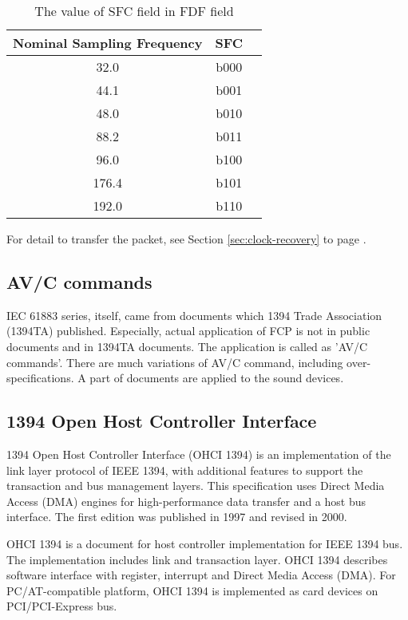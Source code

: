 \documentclass[onecolumn]{article}
\begin{document}
\begin{table}[H]
	\centering
	\caption{{The value of SFC field in FDF field}}
	\label{tbl:sfc-fdf}
	\begin{tabular}{ccc} \toprule
		Nominal Sampling Frequency & SFC \\ \midrule
		32.0	& b000 \\
		44.1	& b001 \\
		48.0	& b010 \\
		88.2	& b011 \\
		96.0	& b100 \\
		176.4	& b101 \\
		192.0	& b110 \\ \bottomrule
	\end{tabular}
\end{table}

For detail to transfer the packet, see Section \ref{sec:clock-recovery} to page \pageref{sec:clock-recovery}.

\subsection{AV/C commands}

IEC 61883 series, itself, came from documents which 1394 Trade Association (1394TA) published. Especially, actual application of FCP is not in public documents and in 1394TA documents. The application is called as 'AV/C commands'. There are much variations of AV/C command, including over-specifications. A part of documents are applied to the sound devices\cite{avc-general-4-2, avc-audio-1, avc-music-1, avc-descriptor-1, avc-info-block-1, avc-stream-format-1, avc-stream-format-1-1, avc-rate-control}.

\subsection{1394 Open Host Controller Interface}
\label{ohci-1394}

1394 Open Host Controller Interface (OHCI 1394) is an implementation of the link layer protocol of IEEE 1394, with additional features to support the transaction and bus management layers. This specification uses Direct Media Access (DMA) engines for high-performance data transfer and a host bus interface. The first edition was published in 1997\cite{ohci1394-1} and revised in 2000\cite{ohci1394-1-1}.

OHCI 1394 is a document for host controller implementation for IEEE 1394 bus. The implementation includes link and transaction layer. OHCI 1394 describes software interface with register, interrupt and Direct Media Access (DMA). For PC/AT-compatible platform, OHCI 1394 is implemented as card devices on PCI/PCI-Express bus.
\end{document}
